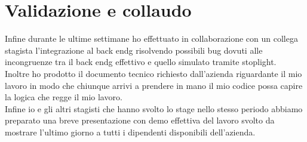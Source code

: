 \section{Validazione e collaudo}

Infine durante le ultime settimane ho effettuato in collaborazione con un collega stagista l'integrazione al \gls{back endg} risolvendo possibili bug dovuti alle incongruenze tra il \gls{back endg} effettivo e quello simulato tramite stoplight.\\
Inoltre ho prodotto il documento tecnico richiesto dall'azienda riguardante il mio lavoro in modo che chiunque arrivi a prendere in mano il mio codice possa capire la logica che regge il mio lavoro.\\
Infine io e gli altri stagisti che hanno svolto lo stage nello stesso periodo abbiamo preparato una breve presentazione con demo effettiva del lavoro svolto da mostrare l'ultimo giorno a tutti i dipendenti disponibili dell'azienda.
